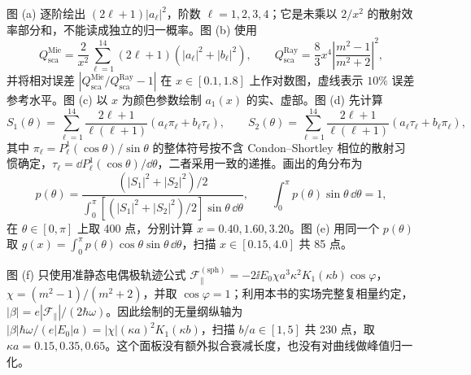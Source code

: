 图 (a) 逐阶绘出 $(2\ell+1)|a_\ell|^2$，阶数 $\ell=1,2,3,4$；它是未乘以 $2/x^2$ 的散射效率部分和，不能读成独立的归一概率。图 (b) 使用
\[
Q_{\mathrm{sca}}^{\mathrm{Mie}}=\frac{2}{x^2}\sum_{\ell=1}^{14}(2\ell+1)(|a_\ell|^2+|b_\ell|^2),\qquad
Q_{\mathrm{sca}}^{\mathrm{Ray}}=\frac83x^4\left|\frac{m^2-1}{m^2+2}\right|^2,
\]
并将相对误差 $|Q_{\mathrm{sca}}^{\mathrm{Mie}}/Q_{\mathrm{sca}}^{\mathrm{Ray}}-1|$ 在 $x\in[0.1,1.8]$ 上作对数图，虚线表示 $10\%$ 误差参考水平。图 (c) 以 $x$ 为颜色参数绘制 $a_1(x)$ 的实、虚部。图 (d) 先计算
\[
S_1(\theta)=\sum_{\ell=1}^{14}\frac{2\ell+1}{\ell(\ell+1)}(a_\ell\pi_\ell+b_\ell\tau_\ell),\qquad
S_2(\theta)=\sum_{\ell=1}^{14}\frac{2\ell+1}{\ell(\ell+1)}(a_\ell\tau_\ell+b_\ell\pi_\ell),
\]
其中 $\pi_\ell=P_\ell^1(\cos\theta)/\sin\theta$ 的整体符号按不含 Condon--Shortley 相位的散射习惯确定，$\tau_\ell=\dd P_\ell^1(\cos\theta)/\dd\theta$，二者采用一致的递推。画出的角分布为
\[
p(\theta)=\frac{(|S_1|^2+|S_2|^2)/2}{\int_0^\pi [(|S_1|^2+|S_2|^2)/2]\sin\theta\,\dd\theta},\qquad
\int_0^\pi p(\theta)\sin\theta\,\dd\theta=1,
\]
在 $\theta\in[0,\pi]$ 上取 400 点，分别计算 $x=0.40,1.60,3.20$。图 (e) 用同一个 $p(\theta)$ 取 $g(x)=\int_0^\pi p(\theta)\cos\theta\sin\theta\,\dd\theta$，扫描 $x\in[0.15,4.0]$ 共 85 点。

图 (f) 只使用准静态电偶极轨迹公式 $\mathcal F_{\parallel}^{(\mathrm{sph})}=-2\ii E_0\chi a^3\kappa^2K_1(\kappa b)\cos\varphi$，\(\chi=(m^2-1)/(m^2+2)\)，并取 $\cos\varphi=1$；利用本书的实场完整复相量约定，$|\beta|=e|\mathcal F_{\parallel}|/(2\hbar\omega)$。因此绘制的无量纲纵轴为 $|\beta|\hbar\omega/(e|E_0|a)=|\chi|(\kappa a)^2K_1(\kappa b)$，扫描 $b/a\in[1,5]$ 共 230 点，取 $\kappa a=0.15,0.35,0.65$。这个面板没有额外拟合衰减长度，也没有对曲线做峰值归一化。
